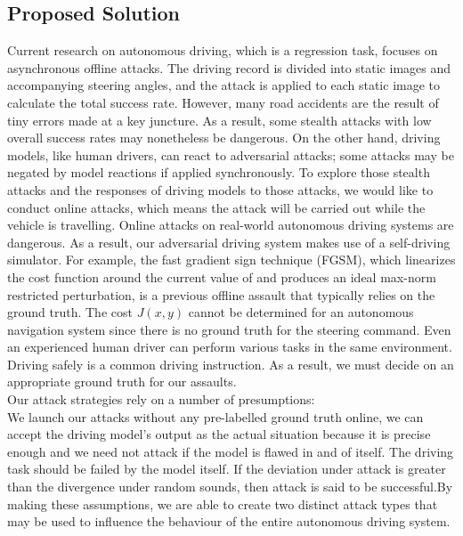 \documentclass[ 12pt,a4paper,twocolumn,fleqn]{article}
\begin{document}
\subsection{Proposed Solution}
Current research on autonomous driving, which is a regression task, focuses on asynchronous offline attacks. The driving record is divided into static images and accompanying steering angles, and the attack is applied to each static image to calculate the total success rate. However, many road accidents are the result of tiny errors made at a key juncture. As a result, some stealth attacks with low overall success rates may nonetheless be dangerous. On the other hand, driving models, like human drivers, can react to adversarial attacks; some attacks may be negated by model reactions if applied synchronously. To explore those stealth attacks and the responses of driving models to those attacks, we would like to conduct online attacks, which means the attack will be carried out while the vehicle is travelling. Online attacks on real-world autonomous driving systems are dangerous. As a result, our adversarial driving system makes use of a self-driving simulator. For example, the fast gradient sign technique (FGSM), which linearizes the cost function around the current value of and produces an ideal max-norm restricted perturbation, is a previous offline assault that typically relies on the ground truth. The cost $J(x, y)$ cannot be determined for an autonomous navigation system since there is no ground truth for the steering command. Even an experienced human driver can perform various tasks in the same environment. Driving safely is a common driving instruction. As a result, we must decide on an appropriate ground truth for our assaults. \\
%
Our attack strategies rely on a number of presumptions:\\
%
We launch our attacks without any pre-labelled ground truth online, we can accept the driving model's output as the actual situation because it is precise enough and we need not attack if the model is flawed in and of itself. The driving task should be failed by the model itself. If the deviation under attack is greater than the divergence under random sounds, then attack is said to be successful.By making these assumptions, we are able to create two distinct attack types that may be used to influence the behaviour of the entire autonomous driving system.
%
\end{document}
